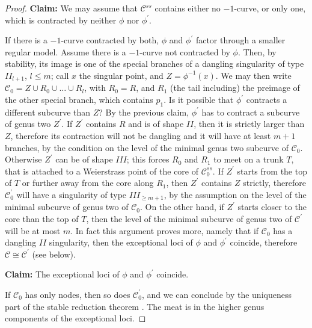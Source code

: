 \documentclass[11pt]{amsart}
\theoremstyle{plain}
\theoremstyle{definition}
\begin{document}
\begin{proof}
 \textbf{Claim:} We may assume that $\mathcal C^{ss}$ contains either no $-1$-curve, or only one, which is contracted by neither $\phi$ nor $\phi^\prime$.
 
 If there is a $-1$-curve contracted by both, $\phi$ and $\phi^\prime$ factor through a smaller regular model. Assume there is a $-1$-curve not contracted by $\phi$. Then, by stability, its image is one of the special branches of a dangling singularity of type $I\!I_{l+1}$, $l\leq m$; call $x$ the singular point, and $Z=\phi^{-1}(x)$. We may then write $\mathcal C_0=Z\cup R_0\cup\ldots\cup R_l$, with $R_0=R$, and $R_1$ (the tail including) the preimage of the other special branch, which contains $p_1$. Is it possible that $\phi^\prime$ contracts a different subcurve than $Z$? By the previous claim, $\phi^\prime$ has to contract a subcurve of genus two $Z^\prime$. If $Z^\prime$ contains $R$ and is of shape $I\!I$, then it is strictly larger than $Z$, therefore its contraction will not be dangling and it will have at least $m+1$ branches, by the condition on the level of the minimal genus two subcurve of $\mathcal C_0$. Otherwise $Z^\prime$ can be of shape $I\!I\!I$; this forces $R_0$ and $R_1$ to meet on a trunk $T$, that is attached to a Weierstrass point of the core of $\mathcal C^{ss}_0$. If $Z^\prime$ starts from the top of $T$ or further away from the core along $R_1$, then $Z^\prime$ contains $Z$ strictly, therefore $\mathcal C^\prime_0$ will have a singularity of type $I\!I\!I_{\geq m+1}$, by the assumption on the level of the minimal subcurve of genus two of $\mathcal C_0$. On the other hand, if $Z^\prime$ starts closer to the core than the top of $T$, then the level of the minimal subcurve of genus two of $\mathcal C^\prime$ will be at most $m$. In fact this argument proves more, namely that if $\mathcal C_0$ has a dangling $I\!I$ singularity, then the exceptional loci of $\phi$ and $\phi^\prime$ coincide, therefore $\mathcal C\cong\mathcal C^\prime$ (see below).
 
 \textbf{Claim:} The exceptional loci of $\phi$ and $\phi^\prime$ coincide.
 
 If $\mathcal C_0$ has only nodes, then so does $\mathcal C^\prime_0$, and we can conclude by the uniqueness part of the stable reduction theorem \cite{DM}. The meat is in the higher genus components of the exceptional loci.
 

\end{proof}
\end{document}
